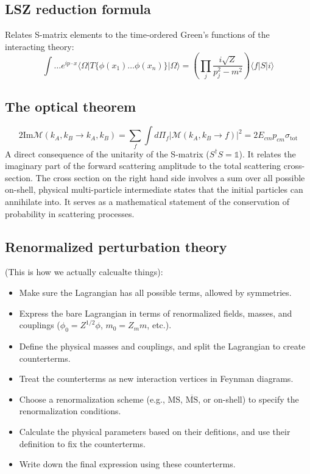 \documentclass{article}
\begin{document}
\subsection{LSZ reduction formula}
Relates S-matrix elements to the time-ordered Green's functions of the interacting theory:
\begin{equation}
    \int \dots e^{i p \cdot x} \langle \Omega | T\{\phi(x_1) \dots \phi(x_n)\} | \Omega \rangle = \left( \prod_j \frac{i \sqrt{Z}}{p_j^2 - m^2} \right) \langle f | S | i \rangle
\end{equation}
\subsection{The optical theorem}
\begin{equation}
    2 \text{Im} \mathcal{M}(k_A, k_B \to k_A, k_B) = \sum_f \int d\Pi_f |\mathcal{M}(k_A, k_B \to f)|^2 = 2 E_{cm} p_{cm} \sigma_{\text{tot}}
\end{equation}
A direct consequence of the unitarity of the S-matrix ($S^\dagger S = \mathbb{1}$). It relates the imaginary part of the forward scattering amplitude to the total scattering cross-section.
\newline
The cross section on the right hand side involves a sum over all possible on-shell, physical multi-particle intermediate states that the initial particles can annihilate into. It serves as a mathematical statement of the conservation of probability in scattering processes.
\subsection{Renormalized perturbation theory}
(This is how we actually calcualte things):
\begin{itemize}
    \item Make sure the Lagrangian has all possible terms, allowed by symmetries.
    \item Express the bare Lagrangian in terms of renormalized fields, masses, and couplings ($\phi_0 = Z^{1/2}\phi$, $m_0 = Z_m m$, etc.).
    \item Define the physical masses and couplings, and split the Lagrangian to create counterterms.
    \item Treat the counterterms as new interaction vertices in Feynman diagrams.
    \item Choose a renormalization scheme (e.g., MS, $\overline{\text{MS}}$, or on-shell) to specify the renormalization conditions.
    \item Calculate the physical parameters based on their defitions, and use their definition to fix the counterterms.
    \item Write down the final expression using these counterterms.
\end{itemize}
\end{document}
